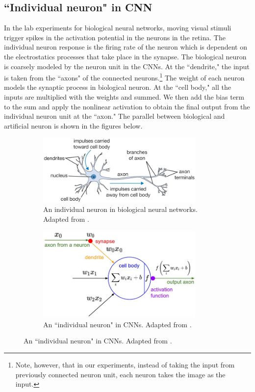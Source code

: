  \subsection{``Individual neuron" in CNN}
 In the lab experiments for biological neural networks, moving visual stimuli trigger spikes in the activation potential in the neurons in the retina. The individual neuron response is the firing rate of the neuron which is dependent on the  electrostatics processes that take place in the synapse. The biological neuron is coarsely modeled by the neuron unit in the CNNs. At the ``dendrite," the input is taken from the ``axons" of the connected neurons.\footnote{Note, however, that in our experiments, instead of taking the input from previously connected neuron unit, each neuron takes the image as the input.} The weight of each neuron models the synaptic process in biological neuron. At the ``cell body," all the inputs are multiplied with the weights and summed. We then add the bias term to the sum and apply the nonlinear activation to obtain the final output from the individual neuron unit at the ``axon." The parallel between biological and artificial neuron is shown in the figures below. 
\begin{figure}[H]
\centering
\begin{subfigure}[b]{0.5\textwidth}
        \includegraphics[width=0.9\textwidth]{figures/artificial/neuron.png}
        \caption{An individual neuron in biological neural networks. Adapted from \cite{cs231n}.}
\end{subfigure}
\hfill
\begin{subfigure}[b]{0.45\textwidth}
        \includegraphics[width=0.9\textwidth]{figures/artificial/neuron_model.jpeg}
        \caption{An ``individual neuron" in CNNs. Adapted from \cite{cs231n}.}
\end{subfigure}
\end{figure} 

